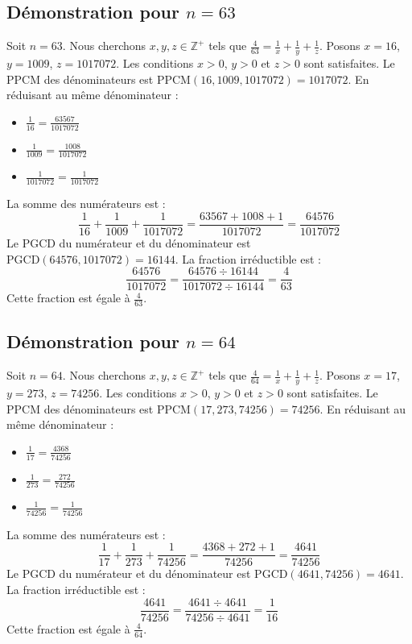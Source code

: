 \documentclass[11pt,a4paper]{article}
\begin{document}
\subsection{Démonstration pour $n = 63$}
Soit $n = 63$. Nous cherchons $x, y, z \in \mathbb{Z}^{+}$ tels que $\frac{4}{63} = \frac{1}{x} + \frac{1}{y} + \frac{1}{z}$.
Posons $x = 16$, $y = 1009$, $z = 1017072$.
Les conditions $x > 0$, $y > 0$ et $z > 0$ sont satisfaites.
Le PPCM des dénominateurs est $\text{PPCM}(16, 1009, 1017072) = 1017072$.
En réduisant au même dénominateur :
\begin{itemize}
    \item $\frac{1}{16} = \frac{63567}{1017072}$
    \item $\frac{1}{1009} = \frac{1008}{1017072}$
    \item $\frac{1}{1017072} = \frac{1}{1017072}$
\end{itemize}
La somme des numérateurs est :
$$ \frac{1}{16} + \frac{1}{1009} + \frac{1}{1017072} = \frac{63567 + 1008 + 1}{1017072} = \frac{64576}{1017072} $$
Le PGCD du numérateur et du dénominateur est $\text{PGCD}(64576, 1017072) = 16144$.
La fraction irréductible est :
$$ \frac{64576}{1017072} = \frac{64576 \div 16144}{1017072 \div 16144} = \frac{4}{63} $$
Cette fraction est égale à $\frac{4}{63}$.

\subsection{Démonstration pour $n = 64$}
Soit $n = 64$. Nous cherchons $x, y, z \in \mathbb{Z}^{+}$ tels que $\frac{4}{64} = \frac{1}{x} + \frac{1}{y} + \frac{1}{z}$.
Posons $x = 17$, $y = 273$, $z = 74256$.
Les conditions $x > 0$, $y > 0$ et $z > 0$ sont satisfaites.
Le PPCM des dénominateurs est $\text{PPCM}(17, 273, 74256) = 74256$.
En réduisant au même dénominateur :
\begin{itemize}
    \item $\frac{1}{17} = \frac{4368}{74256}$
    \item $\frac{1}{273} = \frac{272}{74256}$
    \item $\frac{1}{74256} = \frac{1}{74256}$
\end{itemize}
La somme des numérateurs est :
$$ \frac{1}{17} + \frac{1}{273} + \frac{1}{74256} = \frac{4368 + 272 + 1}{74256} = \frac{4641}{74256} $$
Le PGCD du numérateur et du dénominateur est $\text{PGCD}(4641, 74256) = 4641$.
La fraction irréductible est :
$$ \frac{4641}{74256} = \frac{4641 \div 4641}{74256 \div 4641} = \frac{1}{16} $$
Cette fraction est égale à $\frac{4}{64}$.
\end{document}
